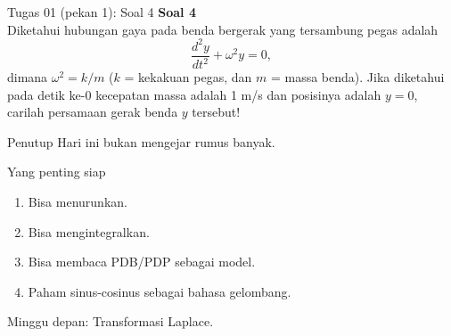 \documentclass[aspectratio=169,11pt]{beamer}
\begin{document}
\begin{frame}{Tugas 01 (pekan 1): Soal 4}
\small
\textbf{Soal 4}\\
Diketahui hubungan gaya pada benda bergerak yang tersambung pegas adalah
\[
\frac{d^2y}{dt^2}+\omega^2y=0,
\]
dimana $\omega^2=k/m$ ($k$ = kekakuan pegas, dan $m$ = massa benda). Jika diketahui pada detik ke-0 kecepatan massa adalah 1 m/s dan posisinya adalah $y=0$, carilah persamaan gerak benda $y$ tersebut!
\end{frame}

\begin{frame}{Penutup}
Hari ini bukan mengejar rumus banyak.
\vspace{0.3cm}
\begin{block}{Yang penting siap}
\begin{enumerate}
  \item Bisa menurunkan.
  \item Bisa mengintegralkan.
  \item Bisa membaca PDB/PDP sebagai model.
  \item Paham sinus-cosinus sebagai bahasa gelombang.
\end{enumerate}
\end{block}
Minggu depan: Transformasi Laplace.
\end{frame}
\end{document}
